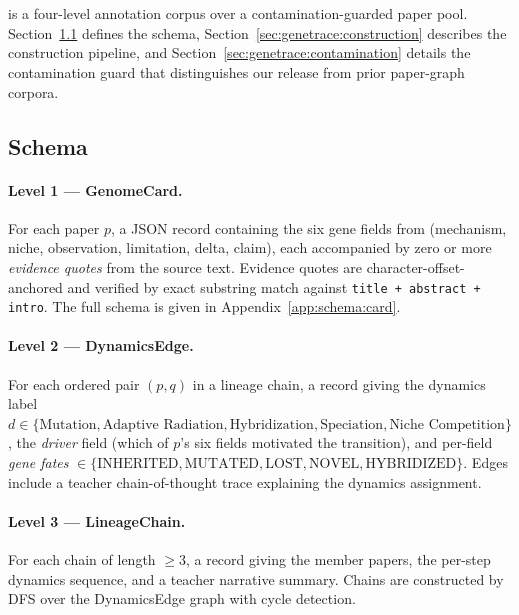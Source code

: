 \section{\genetrace}
\label{sec:genetrace}

\genetrace{} is a four-level annotation corpus over a contamination-guarded
paper pool. Section~\ref{sec:genetrace:schema} defines the schema,
Section~\ref{sec:genetrace:construction} describes the construction
pipeline, and Section~\ref{sec:genetrace:contamination} details the
contamination guard that distinguishes our release from prior paper-graph
corpora.

\subsection{Schema}
\label{sec:genetrace:schema}

\paragraph{Level 1 --- GenomeCard.} For each paper $p$, a JSON record
containing the six gene fields from \ideaevolving{} (mechanism, niche,
observation, limitation, delta, claim), each accompanied by zero or more
\emph{evidence quotes} from the source text. Evidence quotes are
character-offset-anchored and verified by exact substring match against
\texttt{title + abstract + intro}. The full schema is given in
Appendix~\ref{app:schema:card}.

\paragraph{Level 2 --- DynamicsEdge.} For each ordered pair $(p, q)$ in a
lineage chain, a record giving the dynamics label
$d \in \{\text{Mutation}, \text{Adaptive Radiation},
\text{Hybridization}, \text{Speciation}, \text{Niche Competition}\}$, the
\emph{driver} field (which of $p$'s six fields motivated the transition),
and per-field \emph{gene fates}
$\in \{\text{INHERITED}, \text{MUTATED}, \text{LOST}, \text{NOVEL},
\text{HYBRIDIZED}\}$. Edges include a teacher chain-of-thought trace
explaining the dynamics assignment.

\paragraph{Level 3 --- LineageChain.} For each chain of length $\geq 3$, a
record giving the member papers, the per-step dynamics sequence, and a
teacher narrative summary. Chains are constructed by DFS over the
DynamicsEdge graph with cycle detection.

